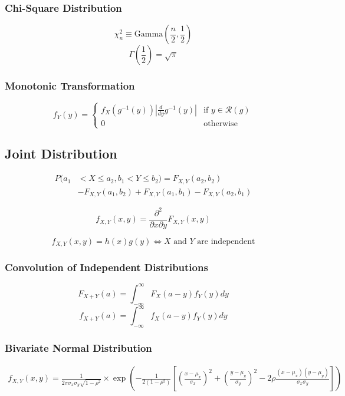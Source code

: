 \documentclass{article}
\begin{document}
\begin{multicols}{2}
\subsubsection*{Chi-Square Distribution}
$$\chi^2_n \equiv \text{Gamma}\left(\frac{n}{2},\frac{1}{2}\right) $$
$$\Gamma(\frac{1}{2}) = \sqrt{\pi}$$
\subsubsection*{Monotonic Transformation}
\begin{equation*}
 f_Y(y) =\left\{\begin{array}{ll}
f_X(g^{-1}(y))\left|\frac{d}{dy}g^{-1}(y)\right| & \text{if } y \in \mathcal{R}(g)\\
0 & \text{otherwise}
\end{array}  \right.
\end{equation*}

\subsection{Joint Distribution}
\begin{equation*}
\begin{split}
 P(a_1 &< X \leq a_2, b_1 < Y \leq b_2) = F_{X,Y}(a_2,b_2)\\ &- F_{X,Y}(a_1,b_2) + F_{X,Y}(a_1,b_1) - F_{X,Y}(a_2,b_1)
\end{split}
\end{equation*}

\begin{equation*}
 f_{X,Y}(x,y) = \frac{\partial^2}{\partial x \partial y}F_{X,Y}(x,y)
\end{equation*}

\begin{equation*}
 f_{X,Y}(x,y) = h(x)g(y) \Leftrightarrow X \text{ and } Y \text{ are independent}
\end{equation*}
\subsubsection*{Convolution of Independent Distributions}
$$F_{X+Y}(a) = \int_{-\infty}^{\infty}F_X(a-y)f_Y(y)dy$$
$$f_{X+Y}(a) = \int_{-\infty}^{\infty}f_X(a-y)f_Y(y)dy$$






\end{multicols}
\subsubsection*{Bivariate Normal Distribution}
\begin{equation*}
\begin{split}
f_{X,Y}(x,y) = \frac{1}{2\pi\sigma_x\sigma_y\sqrt{1-\rho^2}} \times \exp{\left(-\frac{1}{2(1-\rho^2)}\left[\left(\frac{x-\mu_x}{\sigma_x}\right)^2 + \left(\frac{y-\mu_y}{\sigma_y}\right)^2 - 2\rho\frac{(x-\mu_x)(y-\mu_y)}{\sigma_x\sigma_y}\right]\right)}
\end{split} 
\end{equation*}
\end{document}

